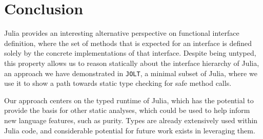 \documentclass[preprint]{sigplanconf}
\newcommand{\xt}[1]{\texttt{#1}}
\newcommand{\jolt}{\xt{JOLT}}
\begin{document}
\section{Conclusion}

Julia provides an interesting alternative perspective on functional interface 
definition, where the set of methods that is expected for an interface is 
defined solely by the concrete implementations of that interface. Despite being
untyped, this property allows us to reason statically about the interface 
hierarchy of Julia, an approach we have demonstrated in \jolt, a minimal subset
of Julia, where we use it to show a path towards static type checking for safe
method calls.

Our approach centers on the typed runtime of Julia, which has the potential to
provide the basis for other static analyses, which could be used to help inform
new language features, such as purity. Types are already extensively used within
Julia code, and considerable potential for future work exists in leveraging them.



\end{document}
